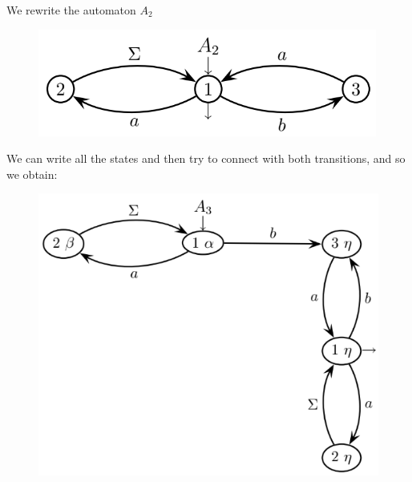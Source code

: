 \documentclass[12pt, a4paper]{report}
\newtheorem[style=M,bodystyle=\normalfont]{theorem}{Theorem}
\newtheorem[style=M,bodystyle=\normalfont]{corollary}{Corollary}
\newtheorem[style=M,bodystyle=\normalfont]{lemma}{Lemma}
\newtheorem[style=M,bodystyle=\normalfont]{definition}{Definition}
\begin{document}
\begin{enumerate}
\begin{figure}[H]
                \end{figure}
                We rewrite the automaton $A_2$
                \begin{figure}[H]
                    \centering
                    \includegraphics[width=0.5\linewidth]{images/FSA6a.png}
                \end{figure}
                We can write all the states and then try to connect with both transitions, and so we obtain: 
                \begin{figure}[H]
                    \centering
                    \includegraphics[width=0.5\linewidth]{images/FSA7a.png}
                \end{figure}
        \end{enumerate}
\end{document}
